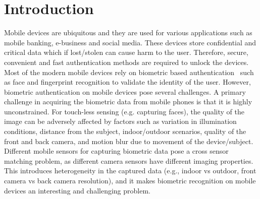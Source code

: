 \documentclass[10pt,twocolumn,letterpaper]{article}
\begin{document}
\section{Introduction}
Mobile devices are ubiquitous and they are used for various applications such as mobile banking, e-business and social media. These devices store confidential and critical data which if lost/stolen can cause harm to the user. Therefore, secure, convenient and fast authentication methods are required to unlock the devices. Most of the modern mobile devices rely on biometric based authentication~\cite{mavcek2016multimodal} such as face and fingerprint recognition to validate the identity of the user. However, biometric authentication on mobile devices pose several challenges. A primary challenge in acquiring the biometric data from mobile phones is that it is highly unconstrained. For touch-less sensing (e.g. capturing faces), the quality of the image can be adversely affected by factors such as variation in illumination conditions, distance from the subject, indoor/outdoor scenarios, quality of the front and back camera, and motion blur due to movement of the device/subject. Different mobile sensors for capturing biometric data pose a cross sensor matching problem, as different camera sensors have different imaging properties. This introduces heterogeneity in the captured data (e.g., indoor vs outdoor, front camera vs back camera resolution), and it makes biometric recognition on mobile devices an interesting and challenging problem. 
\end{document}
